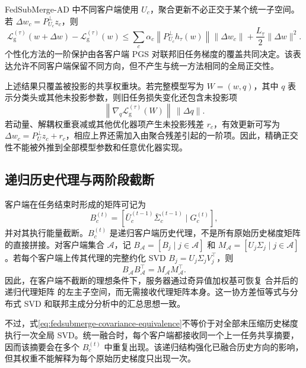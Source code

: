 FedSubMerge-AD 中不同客户端使用 $U_c$，聚合更新不必正交于某个统一子空间。若 $\Delta w_c=P_{U_c}^{\perp}z_c$，则
\begin{equation}
\mathcal{L}_{\mathrm g}^{(\tau)}(w+\Delta w)
-
\mathcal{L}_{\mathrm g}^{(\tau)}(w)
\leq
\sum_c\alpha_c
\left\|P_{U_c}^{\perp}h_{\tau}(w)\right\|
\|\Delta w_c\|
+
\frac{L_{\tau}}{2}\|\Delta w\|^2.
\label{eq:fedsubmerge-personalized-loss-bound}
\end{equation}
个性化方法的一阶保护由各客户端 PGS 对联邦旧任务梯度的覆盖共同决定。该表达允许不同客户端保留不同方向，但不产生与统一方法相同的全局正交性。

上述结果只覆盖被投影的共享权重块。若完整模型写为 $W=(w,q)$，其中 $q$ 表示分类头或其他未投影参数，则旧任务损失变化还包含未投影项
\[
\left\|\nabla_q\mathcal{L}_{\mathrm g}^{(\tau)}(W)\right\|\,
\left\|\Delta q\right\|.
\]
若动量、解耦权重衰减或其他优化器项产生未投影残差 $r_c$，有效更新可写为
$\Delta w_c=P_U^{\perp}z_c+r_c$，相应上界还需加入由聚合残差引起的一阶项。因此，精确正交性不能被外推到全部模型参数和任意优化器实现。

\subsection{递归历史代理与两阶段截断}
\label{subsec:fedsubmerge-theory-compression}

客户端在任务结束时形成的矩阵可记为
\begin{equation}
B_c^{(t)}
=
\left[
\bar U_c^{(t-1)}\bar\Sigma_c^{(t-1)}
\mid
G_c^{(t)}
\right],
\label{eq:fedsubmerge-recursive-proxy}
\end{equation}
并对其执行能量截断。$B_c^{(t)}$ 是递归客户端历史代理，不是所有原始历史梯度矩阵的直接拼接。对客户端集合 $\mathcal{A}$，记
$B_{\mathcal{A}}=[B_j\mid j\in\mathcal{A}]$ 和
$M_{\mathcal{A}}=[U_j\Sigma_j\mid j\in\mathcal{A}]$。若每个客户端上传其代理的完整约化 SVD
$B_j=U_j\Sigma_jV_j^{\top}$，则
\begin{equation}
B_{\mathcal{A}}B_{\mathcal{A}}^{\top}
=
M_{\mathcal{A}}M_{\mathcal{A}}^{\top}.
\label{eq:fedsubmerge-covariance-equivalence}
\end{equation}
因此，在客户端不截断的理想条件下，服务器通过奇异值加权基可恢复 合并后的递归代理矩阵 的左主子空间，而无需接收代理矩阵本身。这一协方差恒等式与分布式 SVD 和联邦主成分分析中的汇总思想一致\cite{iwen2016distributedSVD,grammenos2020federatedPCA}。

不过，式\eqref{eq:fedsubmerge-covariance-equivalence}不等价于对全部未压缩历史梯度执行一次全局 SVD。统一融合时，每个客户端都接收同一个上一任务共享摘要，因而该摘要会在多个 $B_c^{(t)}$ 中重复出现。该递归结构强化已融合历史方向的影响，但其权重不能解释为每个原始历史梯度只出现一次。

